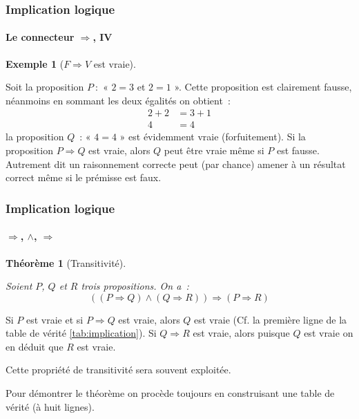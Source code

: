 \documentclass[10pt,notheorems]{beamer}
\theoremstyle{plain}
\newtheorem{theorem}{Théorème}
\theoremstyle{definition} %
\newtheorem{example}{Exemple}
\begin{document}
\begin{frame}
  \frametitle{Implication logique}
  \framesubtitle{Le connecteur $\Rightarrow$, IV}
  \hypertarget{slide_implication_4}{}

  \begin{example}[$F\Rightarrow V$ est vraie]\label{ex:implication:3}

    Soit la proposition $P~:$ « $2=3$ et $2=1$ ». Cette proposition est
    clairement fausse, néanmoins en sommant les deux égalités on
    obtient~:
    \[
      \begin{split}
        2+2 &= 3+1\\
        4 &= 4
      \end{split}
    \]
    la proposition $Q$~: « $4=4$ » est évidemment vraie (forfuitement). Si la
    proposition $P\Rightarrow Q$ est vraie, alors $Q$ peut être vraie
    même si $P$ est fausse. Autrement dit un raisonnement correcte
    peut (par chance) amener à un résultat correct même si le prémisse
    est faux.
  \end{example}

\end{frame}


\begin{frame}
  \frametitle{Implication logique}
  \framesubtitle{$\Rightarrow$, $\land$, $\Rightarrow$}
  \hypertarget{slide_implication_transitivite}{}

  \begin{theorem}[Transitivité]\label{theorem:implication:transitivite}

    Soient $P$, $Q$ et $R$ trois propositions. On a~:
    \[
      ((P\Rightarrow Q) \land (Q\Rightarrow R)) \Rightarrow
      (P\Rightarrow R)
    \]
  \end{theorem}

  \bigskip

  Si $P$ est vraie et si $P\Rightarrow Q$ est vraie, alors $Q$ est
  vraie (Cf. la première ligne de la table de vérité
  \hyperlink{slide_implication_1}{\ref{tab:implication}}). Si $Q\Rightarrow R$ est vraie, alors puisque
  $Q$ est vraie on en déduit que $R$ est vraie.\newline

  Cette propriété de transitivité sera souvent exploitée.\newline

  Pour démontrer le théorème on procède toujours en construisant une
  table de vérité (à huit lignes).\newline

\end{frame}
\end{document}
